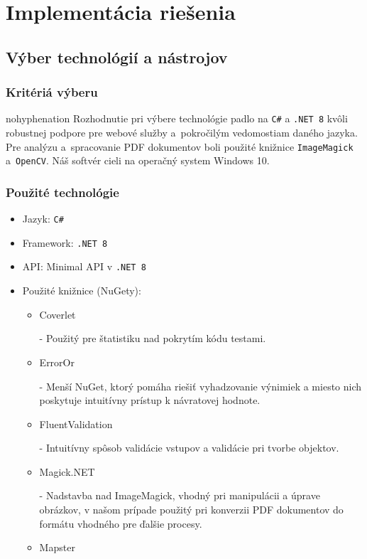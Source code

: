\chapter{Implementácia riešenia}
\label{chap:SixthChapter}
\section{Výber technológií a nástrojov}
\subsection{Kritériá výberu}
\begin{hyphenrules}{nohyphenation}
Rozhodnutie pri výbere technológie padlo na \texttt{C\#} a \texttt{.NET 8} kvôli robustnej podpore pre webové služby a~pokročilým vedomostiam daného jazyka. Pre analýzu a~spracovanie PDF dokumentov boli použité knižnice \texttt{ImageMagick} a~\texttt{OpenCV}. Náš softvér cieli na operačný system Windows 10.

\subsection{Použité technológie}
\begin{itemize}
    \item Jazyk: \texttt{C\#}
    \item Framework: \texttt{.NET 8}
    \item API: Minimal API v \texttt{.NET 8}
    \item Použité knižnice (NuGety): 
    \begin{itemize}
        \item Coverlet \cite{coverlet}
        
        - Použitý pre štatistiku nad pokrytím kódu testami.
        \item ErrorOr \cite{error-or}
        
        - Menší NuGet, ktorý pomáha riešiť vyhadzovanie výnimiek a miesto nich poskytuje intuitívny prístup k návratovej hodnote.
        \item FluentValidation \cite{fluentvalidation}

        - Intuitívny spôsob validácie vstupov a validácie pri tvorbe objektov.
        \item Magick.NET \cite{magicknet}

        - Nadstavba nad ImageMagick, vhodný pri manipulácii a úprave obrázkov, v našom prípade použitý pri konverzii PDF dokumentov do formátu vhodného pre ďalšie procesy.
        \item Mapster \cite{mapster}


\end{itemize}
\end{itemize}
\end{hyphenrules}

